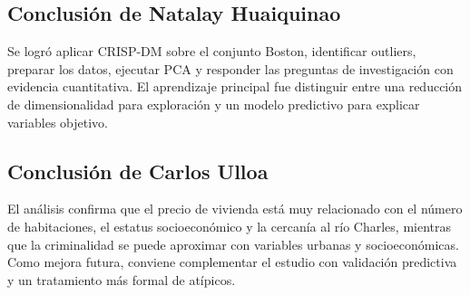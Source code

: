 \subsection*{Conclusi\'on de Natalay Huaiquinao}
Se logr\'o aplicar CRISP-DM sobre el conjunto Boston, identificar outliers, preparar los datos, ejecutar PCA y responder las preguntas de investigaci\'on con evidencia cuantitativa. El aprendizaje principal fue distinguir entre una reducci\'on de dimensionalidad para exploraci\'on y un modelo predictivo para explicar variables objetivo.

\subsection*{Conclusi\'on de Carlos Ulloa}
El an\'alisis confirma que el precio de vivienda est\'a muy relacionado con el n\'umero de habitaciones, el estatus socioecon\'omico y la cercan\'ia al r\'io Charles, mientras que la criminalidad se puede aproximar con variables urbanas y socioecon\'omicas. Como mejora futura, conviene complementar el estudio con validaci\'on predictiva y un tratamiento m\'as formal de at\'ipicos.